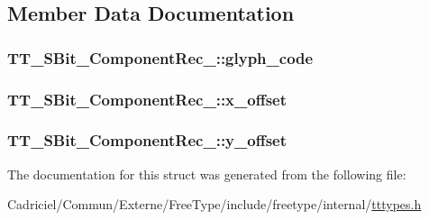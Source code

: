 \subsection{Member Data Documentation}
\hypertarget{struct_t_t___s_bit___component_rec___a357eef9c05c65034b506cdd48271e562}{
\subsubsection[{glyph\-\_\-code}]{ T\-T\-\_\-\-S\-Bit\-\_\-\-Component\-Rec\-\_\-\-::glyph\-\_\-code}}\label{struct_t_t___s_bit___component_rec___a357eef9c05c65034b506cdd48271e562}
\hypertarget{struct_t_t___s_bit___component_rec___a97799704aa59bf737e274289fa70ca3f}{
\subsubsection[{x\-\_\-offset}]{ T\-T\-\_\-\-S\-Bit\-\_\-\-Component\-Rec\-\_\-\-::x\-\_\-offset}}\label{struct_t_t___s_bit___component_rec___a97799704aa59bf737e274289fa70ca3f}
\hypertarget{struct_t_t___s_bit___component_rec___af24f91b7d5e0268a223514ad68a9a10b}{
\subsubsection[{y\-\_\-offset}]{ T\-T\-\_\-\-S\-Bit\-\_\-\-Component\-Rec\-\_\-\-::y\-\_\-offset}}\label{struct_t_t___s_bit___component_rec___af24f91b7d5e0268a223514ad68a9a10b}


The documentation for this struct was generated from the following file\-:\begin{DoxyCompactItemize}
\item 
Cadriciel/\-Commun/\-Externe/\-Free\-Type/include/freetype/internal/\hyperlink{tttypes_8h}{tttypes.\-h}\end{DoxyCompactItemize}
